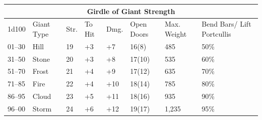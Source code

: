 \noindent
\begin{tabular}{|p{}|p{}|p{}|p{}|p{}|p{}|p{}|p{}|}
\multicolumn{8}{c}{Girdle of Giant Strength} \\
\hline
1d100	& Giant Type	& Str.	& To Hit	& Dmg.	& Open Doors	& Max. Weight	& Bend Bars/ Lift Portcullis \\
\hline\hline
\rowcolor[gray]{.9}01--30	& Hill	& 19	& +3	& +7	& 16(8)	& 485	& 50\% \\
31--50	& Stone	& 20	& +3	& +8	& 17(10)	& 535	& 60\% \\
\rowcolor[gray]{.9}51--70	& Frost	& 21	& +4	& +9	& 17(12)	& 635	& 70\% \\
71--85	& Fire	& 22	& +4	& +10	& 18(14)	& 785	& 80\% \\
\rowcolor[gray]{.9}86--95	& Cloud	& 23	& +5	& +11	& 18(16)	& 935	& 90\% \\
96--00	& Storm	& 24	& +6	& +12	& 19(17)	& 1,235	& 95\% \\
\hline
\end{tabular}

